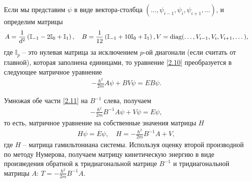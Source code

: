 \documentclass[14pt]{extarticle}
\newcommand{\lb}{\left(}
\newcommand{\rb}{\right)}
\newcommand{\bbI}{\mathbb{I}}
\begin{document}
Если мы представим $\psi$ в виде вектора-столбца $(\dots, \psi_{i - 1}, \psi_i, \psi_{i + 1}, \dots)$, и определим матрицы 
\begin{gather}
		A = \frac{1}{d^2} \lb \bbI_{- 1} - 2 \bbI_0 + \bbI_1 \rb, \quad B = \frac{1}{12} \lb \bbI_{-1} + 10 \bbI_{0} + \bbI_{1} \rb, V = \textup{diag} (\dots, V_{i - 1}, V_i, V_{i + 1}, \dots), \label{2.10.2} 
\end{gather}
где $\bbI_p$ -- это нулевая матрица за исключением $p$-ой диагонали (если считать от главной), которая заполнена единицами, то уравнение \eqref{2.10} преобразуется в следующее матричное уравнение
\begin{gather}
	- \frac{\hbar^2}{2m} A \psi + B V \psi = E B \psi. \label{2.11}
\end{gather}

Умножая обе части \eqref{2.11} на $B^{-1}$ слева, получаем
\begin{gather}
	- \frac{\hbar^2}{2m} B^{-1} A \psi + V \psi = E \psi, \label{2.12}
\end{gather}
то есть, матричное уравнение на собственные значения матрицы $H$
\begin{gather}
		H \psi = E \psi, \quad H = -\frac{\hbar^2}{2m} B^{-1} A + V, \label{2.13}
\end{gather}
где $H$ -- матрица гамильтониана системы. Используя оценку второй производной по методу Нумерова, получаем матрицу кинетическую энергию в виде произведения обратной к тридиагональной матрице $B^{-1}$ и тридиагональной матрицы $A$: $\displaystyle T = - \frac{\hbar^2}{2m} B^{-1} A$.  
\end{document}
